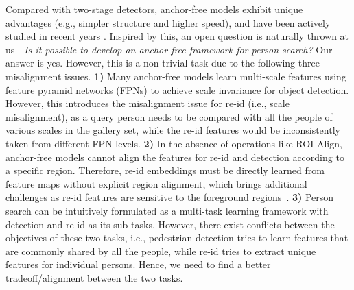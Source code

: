\documentclass[journal]{IEEEtran}
\begin{document}
Compared with two-stage detectors, anchor-free models exhibit unique advantages (e.g., simpler structure and higher speed), and have been actively studied in recent years \cite{DBLP:conf/cvpr/RedmonDGF16,DBLP:conf/eccv/LawD18,DBLP:conf/cvpr/LiuLRHY19,DBLP:conf/iccv/DuanBXQH019}. Inspired by this, an open question is naturally thrown at us - \emph{Is it possible to develop an anchor-free framework for person search?} Our answer is yes. However, this is a non-trivial task due to the following three misalignment issues. \textbf{1)} Many anchor-free models learn multi-scale features using feature pyramid networks (FPNs) \cite{DBLP:conf/cvpr/LinDGHHB17} to achieve scale invariance for object detection. However, this introduces the misalignment issue for re-id (i.e., scale misalignment), as a query person needs to be compared with all the people of various scales in the gallery set, while the re-id features would be inconsistently taken from different FPN levels. \textbf{2)} In the absence of operations like ROI-Align, anchor-free models cannot align the features for re-id and detection according to a specific region. Therefore, re-id embeddings must be directly learned from feature maps without explicit region alignment, which brings additional challenges as re-id features are sensitive to the foreground regions~\cite{DBLP:conf/cvpr/DongZST20a,DBLP:conf/iccv/HanYZTZGS19}. \textbf{3)} Person search can be intuitively formulated as a multi-task learning framework with detection and re-id as its sub-tasks. However, there exist conflicts between the objectives of these two tasks, i.e., pedestrian detection tries to learn features that are commonly shared by all the people, while re-id tries to extract unique features for individual persons. Hence, we need to find a better tradeoff/alignment between the two tasks.
\end{document}
